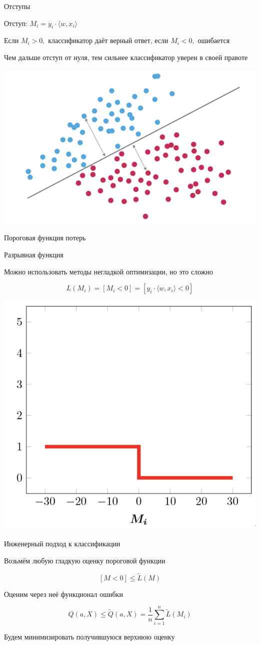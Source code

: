 \documentclass[notes,12pt, aspectratio=169]{beamer}
\newenvironment{wideitemize}{\itemize\addtolength{\itemsep}{10pt}}{\enditemize}
\begin{document}
\begin{frame}{Отступы}
	
	\begin{wideitemize}
		\item \alert{Отступ:} $M_i = y_i  \cdot  \langle w, x_i \rangle$
		\item Если $M_i > 0,$ классификатор даёт верный ответ, если $M_i<0,$ ошибается
		\item Чем дальше отступ от нуля, тем сильнее классификатор уверен в своей правоте		
	\end{wideitemize}

		\begin{center}
			\includegraphics[width=.45\linewidth]{mi.png}
		\end{center}
\end{frame}


\begin{frame}{Пороговая функция потерь}
	
	\begin{wideitemize}
		\item  Разрывная функция
		\item  Можно использовать методы негладкой оптимизации, но это сложно
	\end{wideitemize}
	
	\[
	L(M_i) =[M_i < 0] = [y_i  \cdot  \langle w, x_i \rangle < 0]
	\]
	
	
	\begin{center}
		\includegraphics[width=.3\linewidth]{step.png}
	\end{center}
\end{frame}


\begin{frame}{Инженерный подход к классификации}

	\begin{wideitemize}
		\item  Возьмём любую гладкую оценку пороговой функции
		
		\[ [M < 0] \le \tilde{L}(M) \]
		
		\item  Оценим через неё функционал ошибки
		
		\[
		Q(a, X) \le \tilde{Q}(a, X) = \frac{1}{n} \sum_{i=1}^n \tilde L(M_i)
		\]
		
		\item Будем минимизировать получившуюся верхнюю оценку
	\end{wideitemize}
\end{frame}
\end{document}
